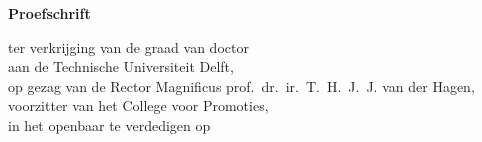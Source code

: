 \begin{titlepage}

\begin{center}

\vspace*{2\bigskipamount}

{\makeatletter
\titlestyle\bfseries\LARGE\@title
\makeatother}

{\makeatletter
\ifx\@subtitle\undefined\else
    \bigskip
    \titlefont\titleshape\Large\@subtitle
\fi
\makeatother}

\end{center}

\cleardoublepage
\thispagestyle{empty}

\begin{center}


\vspace*{2\bigskipamount}

{\makeatletter
\titlestyle\bfseries\LARGE\@title
\makeatother}

{\makeatletter
\ifx\@subtitle\undefined\else
    \bigskip
    \titlefont\titleshape\Large\@subtitle
\fi
\makeatother}

\vfill


{\Large\titlefont\bfseries Proefschrift}

\bigskip
\bigskip

ter verkrijging van de graad van doctor \\
aan de Technische Universiteit Delft, \\
op gezag van de Rector Magnificus prof.\ dr.\ ir.\ T.\ H.\ J.\ J. van der Hagen, \\
voorzitter van het College voor Promoties, \\
in het openbaar te verdedigen op \\


\end{center}
\end{titlepage}
